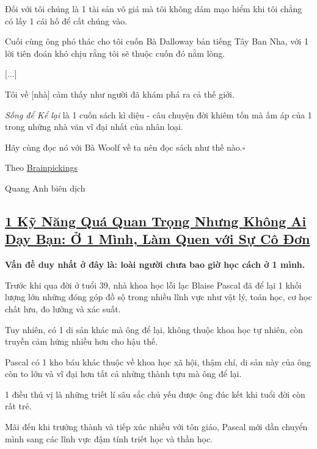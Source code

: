 \documentclass{article}
\begin{document}
%
Đối với tôi chúng là 1 tài sản vô giá mà tôi không dám mạo hiểm khi tôi chẳng có lấy 1 cái hố để cất chúng vào.

Cuối cùng ông phó thác cho tôi cuốn Bà Dalloway bản tiếng Tây Ban Nha, với 1 lời tiên đoán khó chịu rằng tôi sẽ thuộc cuốn đó nằm lòng.

[$\ldots$]

%
Tôi về [nhà] cảm thấy như người đã khám phá ra cả thế giới.

%
\textit{Sống để Kể lại} là 1 cuốn sách kì diệu - câu chuyện đời khiêm tốn mà ấm áp của 1 trong những nhà văn vĩ đại nhất của nhân loại.

Hãy cùng đọc nó với Bà Woolf về ta nên đọc sách như thế nào.\hfill$\square$

\begin{flushright}
	Theo \href{https://www.brainpickings.org/2015/04/06/marquez-favorite-books/?fbclid=IwAR0JImPeIOfnzQxVa-czES1VWLGVG-kyYEdAQm6O2yl0DAJvyrA6V-kO08s}{Brainpickings}
	
	Quang Anh biên dịch
\end{flushright}


\subsection{\href{http://tramdoc.vn/tin-tuc/mot-ki-nang-qua-quan-trong-nhung-khong-ai-day-ban-o-mot-minh-lam-quen-voi-su-co-don-nyV68W.html}{1 Kỹ Năng Quá Quan Trọng Nhưng Không Ai Dạy Bạn: Ở 1 Mình, Làm Quen với Sự Cô Đơn}}

\textbf{Vấn đề duy nhất ở đây là: loài người chưa bao giờ học cách ở 1 mình.}

%
Trước khi qua đời ở tuổi 39, nhà khoa học lỗi lạc Blaise Pascal đã để lại 1 khối lượng lớn những đóng góp đồ sộ trong nhiều lĩnh vực như vật lý, toán học, cơ học chất lưu, đo lường và xác suất.

%
Tuy nhiên, có 1 di sản khác mà ông để lại, không thuộc khoa học tự nhiên, còn truyền cảm hứng nhiều hơn cho hậu thế.

Pascal có 1 kho báu khác thuộc về khoa học xã hội, thậm chí, di sản này của ông còn to lớn và vĩ đại hơn tất cả những thành tựu mà ông để lại.

%
1 điều thú vị là những triết lí sâu sắc chủ yếu được ông đúc kết khi tuổi đời còn rất trẻ.

Mãi đến khi trưởng thành và tiếp xúc nhiều với tôn giáo, Pascal mới dần chuyển mình sang các lĩnh vực đậm tính triết học và thần học. 
\end{document}
